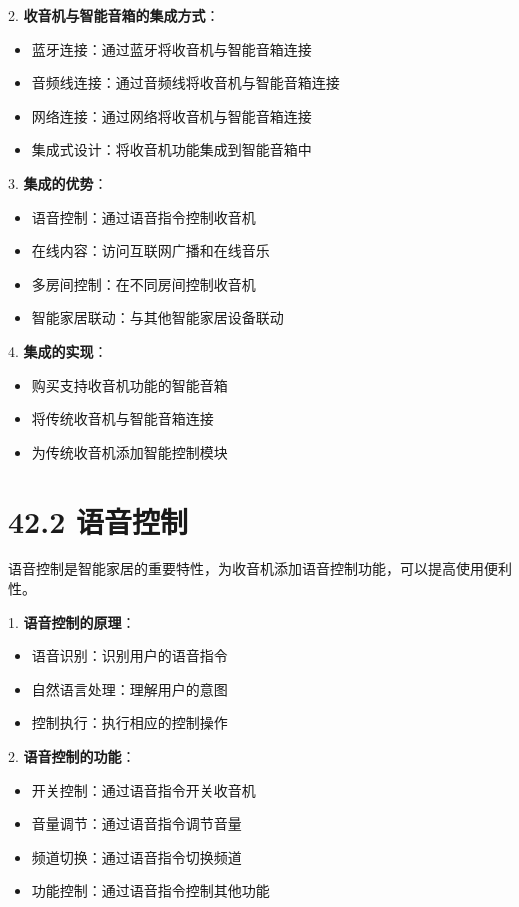 \documentclass[12pt,UTF8]{ctexbook}
\begin{document}
2. \textbf{收音机与智能音箱的集成方式}：
   \begin{itemize}[leftmargin=3.5em]
   \item 蓝牙连接：通过蓝牙将收音机与智能音箱连接
   \item 音频线连接：通过音频线将收音机与智能音箱连接
   \item 网络连接：通过网络将收音机与智能音箱连接
   \item 集成式设计：将收音机功能集成到智能音箱中
   \end{itemize}

3. \textbf{集成的优势}：
   \begin{itemize}[leftmargin=3.5em]
   \item 语音控制：通过语音指令控制收音机
   \item 在线内容：访问互联网广播和在线音乐
   \item 多房间控制：在不同房间控制收音机
   \item 智能家居联动：与其他智能家居设备联动
   \end{itemize}

4. \textbf{集成的实现}：
   \begin{itemize}[leftmargin=3.5em]
   \item 购买支持收音机功能的智能音箱
   \item 将传统收音机与智能音箱连接
   \item 为传统收音机添加智能控制模块
   \end{itemize}

\section*{42.2 语音控制}

语音控制是智能家居的重要特性，为收音机添加语音控制功能，可以提高使用便利性。

1. \textbf{语音控制的原理}：
   \begin{itemize}[leftmargin=3.5em]
   \item 语音识别：识别用户的语音指令
   \item 自然语言处理：理解用户的意图
   \item 控制执行：执行相应的控制操作
   \end{itemize}

2. \textbf{语音控制的功能}：
   \begin{itemize}[leftmargin=3.5em]
   \item 开关控制：通过语音指令开关收音机
   \item 音量调节：通过语音指令调节音量
   \item 频道切换：通过语音指令切换频道
   \item 功能控制：通过语音指令控制其他功能
   \end{itemize}
\end{document}
